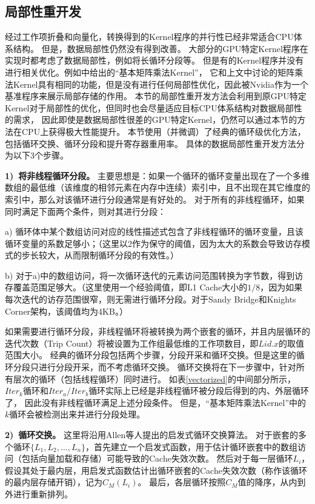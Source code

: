 \subsection{局部性重开发}
\label{localityreexploresec}
经过工作项折叠和向量化，转换得到的Kernel程序的并行性已经非常适合CPU体系结构。
但是，数据局部性仍然没有得到改善。
大部分的GPU特定Kernel程序在实现时都考虑了数据局部性，例如将长循环分段等。
但是有的Kernel程序并没有进行相关优化。例如\cite{oclprogrammingguide}中给出的``基本矩阵乘法Kernel''，
它和上文中讨论的矩阵乘法Kernel具有相同的功能，但是没有进行任何局部性优化，因此被Nvidia作为一个基准程序来展示局部存储的作用。
本节的局部性重开发方法会利用到原GPU特定Kernel对于局部性的优化，但同时也会尽量适应目标CPU体系结构对数据局部性的需求，
因此即使是数据局部性很差的GPU特定Kernel，仍然可以通过本节的方法在CPU上获得极大性能提升。
本节使用（并微调）了经典的循环级优化方法，包括循环交换、循环分段和提升寄存器重用率。
具体的数据局部性重开发方法分为以下3个步骤。

{\bf 1)\ 将非线程循环分段。} 主要思想是：如果一个循环的循环变量出现在了一个多维数组的最低维（该维度的相邻元素在内存中连续）索引中，且不出现在其它维度的索引中，那么对该循环进行分段通常是有好处的。
对于所有的非线程循环，如果同时满足下面两个条件，则对其进行分段：
\begin{compactitem}
\item[a)]{循环体中某个数组访问对应的线性描述式包含了非线程循环的循环变量，且该循环变量的系数足够小；（这里以2作为保守的阈值，因为太大的系数会导致访存模式的步长较大，从而限制循环分段的有效性。）}
\item[b)]{对于a)中的数组访问，将一次循环迭代的元素访问范围转换为字节数，得到访存覆盖范围足够大。（这里使用一个经验阈值，即L1 Cache大小的$1/8$，因为如果每次迭代的访存范围很窄，则无需进行循环分段。对于Sandy Bridge和Knights Corner架构，该阈值均为4KB。）}
\end{compactitem}
如果需要进行循环分段，非线程循环将被转换为两个嵌套的循环，并且内层循环的迭代次数（Trip Count）将被设置为工作组最低维的工作项数目，即$Lid.x$的取值范围大小。
经典的循环分段包括两个步骤，分段开采和循环交换。但是这里的循环分段只进行分段开采，而不考虑循环交换。
循环交换将在下一步骤中，针对所有层次的循环（包括线程循环）同时进行。
如表\ref{vectorized}的中间部分所示，${Iter_k}$循环和${Iter_a/Iter_b}$循环实际上已经是非线程循环被分段后得到的内、外层循环了，
因此没有非线程循环满足上述分段条件。
但是，``基本矩阵乘法Kernel''中的$k$循环会被检测出来并进行分段处理。

{\bf 2)\ 循环交换。} 这里将沿用Allen等人提出的启发式循环交换算法。
对于嵌套的多个循环$\{ {L_1}, {L_2},\ldots ,{L_n} \}$，首先建立一个启发式函数，用于估计循环嵌套中的数组访问（包括向量加载和存储）可能导致的Cache失效次数。
然后对于每一层循环${L_i}$，假设其处于最内层，用启发式函数估计出循环嵌套的Cache失效次数（称作该循环的最内层存储开销），记为$C_M({L_i})$。
最后，各层循环按照$C_M$值的降序，从内到外进行重新排列。

